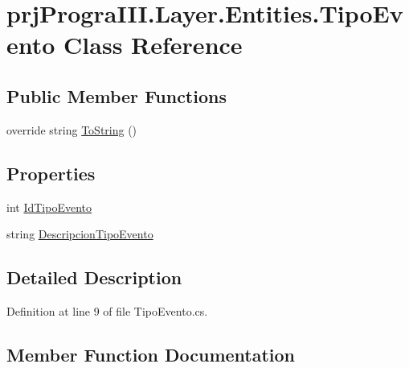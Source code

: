 \hypertarget{classprj_progra_i_i_i_1_1_layer_1_1_entities_1_1_tipo_evento}{}\section{prj\+Progra\+I\+I\+I.\+Layer.\+Entities.\+Tipo\+Evento Class Reference}
\label{classprj_progra_i_i_i_1_1_layer_1_1_entities_1_1_tipo_evento}
\subsection*{Public Member Functions}
\begin{DoxyCompactItemize}
\item 
override string \hyperlink{classprj_progra_i_i_i_1_1_layer_1_1_entities_1_1_tipo_evento_a3e7ec488bca13952e121db2494a85f15}{To\+String} ()
\end{DoxyCompactItemize}
\subsection*{Properties}
\begin{DoxyCompactItemize}
\item 
int \hyperlink{classprj_progra_i_i_i_1_1_layer_1_1_entities_1_1_tipo_evento_a81422e61a9069412070c97b4c7b2e083}{Id\+Tipo\+Evento}
\item 
string \hyperlink{classprj_progra_i_i_i_1_1_layer_1_1_entities_1_1_tipo_evento_a89828d2eb30a4ea3ee17a74ac719a339}{Descripcion\+Tipo\+Evento}
\end{DoxyCompactItemize}


\subsection{Detailed Description}


Definition at line 9 of file Tipo\+Evento.\+cs.



\subsection{Member Function Documentation}
\hypertarget{classprj_progra_i_i_i_1_1_layer_1_1_entities_1_1_tipo_evento_a3e7ec488bca13952e121db2494a85f15}{}\label{classprj_progra_i_i_i_1_1_layer_1_1_entities_1_1_tipo_evento_a3e7ec488bca13952e121db2494a85f15} 
